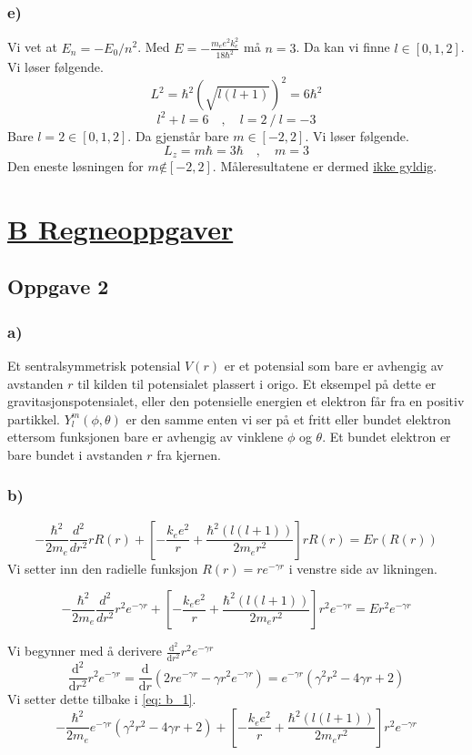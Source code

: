 \documentclass[norsk]{article}
\begin{document}
\subsubsection*{e)}
Vi vet at $E_n = -E_0 / n^2$. Med $\displaystyle E = - \frac{m_ee^2k^2_{e}}{18ℏ^2}$ må $n = 3$. 
Da kan vi finne $l ∈ [0,1,2]$. Vi løser følgende. 
\[
L^2 = ℏ^2\left(\sqrt{l(l+1)}\right)^2 = 6ℏ^2
\]
\[
l^2 + l = 6 \quad , \quad l = 2 \ /\ l=-3
\]
Bare $l=2 ∈ [0,1,2]$. Da gjenstår bare $m ∈ [-2,2]$. Vi løser følgende. 
\[
L_z = mℏ = 3ℏ \quad , \quad m = 3
\]
Den eneste løsningen for $m \not∈ [-2,2]$. Måleresultatene er dermed \underline{ikke gyldig}. 

\section*{\underline{B Regneoppgaver}}
\subsection*{Oppgave 2}
\subsubsection*{a)}
Et sentralsymmetrisk potensial $V(r)$ er et potensial som bare er avhengig av avstanden $r$ til kilden til potensialet plassert i origo. Et eksempel på dette er gravitasjonspotensialet, eller den potensielle energien et elektron får fra en positiv partikkel. 
$Y_{l}^{m}(ϕ,θ)$ er den samme enten vi ser på et fritt eller bundet elektron ettersom funksjonen bare er avhengig av vinklene $ϕ$ og $θ$. Et bundet elektron er bare bundet i avstanden $r$ fra kjernen.

\subsubsection*{b)}
\[
- \frac{ℏ^2}{2m_e} \frac{d^2}{dr^2}rR(r) + \left[- \frac{k_ee^2}{r} + \frac{ℏ^2(l(l+1))}{2 m_e r^2}\right]rR(r)  = Er(R(r))
\]
Vi setter inn den radielle funksjon $R(r) = re ^{-γr}$ i venstre side av likningen. 

\begin{equation}\label{eq: b_1}
    - \frac{ℏ^2}{2m_e} \frac{d^2}{dr^2}r^2e^{-γr} + \left[- \frac{k_ee^2}{r} + \frac{ℏ^2(l(l+1))}{2 m_e r^2}\right]r^2e^{-γr}  = Er^2e^{-γr}
\end{equation}

Vi begynner med å derivere $\displaystyle \frac{\mathrm{d}^2}{\mathrm{d}r^2}r^2e^{-γr}$
\[
\frac{\mathrm{d}^2}{\mathrm{d}r^2}r^2e^{-γr} = \frac{\mathrm{d}}{\mathrm{d}r}\left(2re^{-γr} -γr^2e^{-γr}\right) = e^{-γr}\left(γ^2r^2 - 4γr + 2\right)
\]
Vi setter dette tilbake i \cref{eq: b_1}.
\[
- \frac{ℏ^2}{2 m_e} e^{-γr}\left(γ^2r^2 - 4γr + 2\right) + \left[- \frac{k_ee^2}{r} + \frac{ℏ^2(l(l+1))}{2 m_e r^2}\right]r^2e^{-γr}
\]
\end{document}
